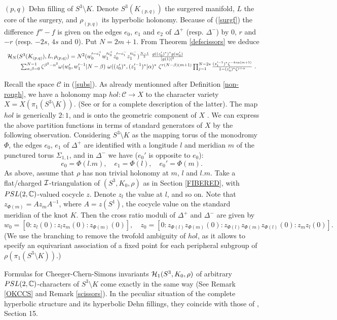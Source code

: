 $(p,q)$ Dehn filling of $S^3\setminus K$. Denote $S^3(K_{(p,q)})$ the
surgered manifold, $L$ the core of the surgery, and $\rho_{(p,q)}$ its
hyperbolic holonomy. Because of (\ref{surgf}) the difference $f''-f$
is given on the edges $e_0$, $e_1$ and $e_2$ of $\Delta^+$
(resp. $\Delta^-$) by $0$, $r$ and $-r$ (resp. $-2s$, $4s$ and
$0$). Put $N=2m+1$. From Theorem \ref{defscissors} we deduce
$$\begin{array}{l}{\mathcal H}_N(S^3(K_{(p,q)}),L,\rho_{(p,q)}) = N^{2}
(w_0'^{-c_1^+}w_1'^{c_0^+}z_0'^{-c_1^-}z_1'^{c_0^-})^{\frac{N-1}{2}}\
\frac{g((z_0')^*)^*g(w_0')}{|g(1)|^2}\\
\hspace{0.8cm}\sum_{\alpha,\beta=0}^{N-1}
  \zeta^{\beta^2-\alpha^2}\omega(w_0',w_1'^{-1}\vert N-\beta)\
  \omega((z_0')^*,(z_1'^{-1})^*\vert \alpha)^*\
  \zeta^{r(N-\beta)(m+1)}\prod_{j=1}^{N-2s}
  \frac{(z_1'^{-1})^*\zeta^{-4s\alpha(m+1)}}{1-(z_0')^*\zeta^{j+\alpha}}\
  .
\end{array}$$
\begin{remark}{\rm Recall the space $\mathcal{C}$ in (\ref{subs}). 
As already mentionned after Definition \ref{non-rough}, we have a
holonomy map $hol:\mathcal{C}\rightarrow X$ to the character variety
$X=X(\pi_1(S^3\setminus K))$. (See \cite{Ril} or \cite{GAM} for a
complete description of the latter). The map $hol$ is generically
$2:1$, and is onto the geometric component of $X$ \cite{Cha}. We can
express the above partition functions in terms of standard generators
of $X$ by the following observation. Considering $S^3\setminus K$ as
the mapping torus of the monodromy $\Phi$, the edges $e_0$, $e_1$ of
$\Delta^+$ are identified with a longitude $l$ and meridian $m$ of the
punctured torus $\Sigma_{1,1}$, and in $\Delta^-$ we have ($e_0'$ is
opposite to $e_0$):
$$e_0=\Phi(l.m),\quad e_1=\Phi(l),\quad e_0'= \Phi(m).$$ As above,
assume that $\rho$ has non trivial holonomy at $m$, $l$ and
$l.m$. Take a flat/charged ${\mathcal I}$-triangulation of $(S^3,K_0,\rho)$ as
in Section \ref{FIBERED}, with $PSL(2,\mathbb{C})$-valued cocycle $z$. Denote
$z_l$ the value at $l$, and so on. Note that $z_{\Phi(m)}=Az_mA^{-1}$,
where $A=z(S^1)$, the cocycle value on the standard meridian of the
knot $K$. Then the cross ratio moduli of $\Delta^+$ and $\Delta^-$ are
given by
$$w_0=[0:z_l(0):z_lz_m(0):z_{\Phi(m)}(0)],\quad z_0=
[0:z_{\Phi(l)}z_{\Phi(m)}(0):z_{\Phi(l)}z_{\Phi(m)}z_{\Phi(l)}(0):z_mz_l(0)].$$
(We use the branching to remove the twofold ambiguity of $hol$, as it
allows to specify an equivariant association of a fixed point for each
peripheral subgroup of $\rho(\pi_1(S^3\setminus K))$.)}
\end{remark}
\begin{remark}
{\rm Formulas for Cheeger-Chern-Simons invariants
${\mathcal H}_1(S^3,K_0,\rho)$ of arbitrary $PSL(2,\mathbb{C})$-characters of
$S^3\setminus K$ come exactly in the same way (See Remark \ref{OKCCS}
and Remark \ref{scissors}). In the peculiar situation of the complete
hyperbolic structure and its hyperbolic Dehn fillings, they coincide
with those of \cite{N}, Section 15.}
\end{remark}
